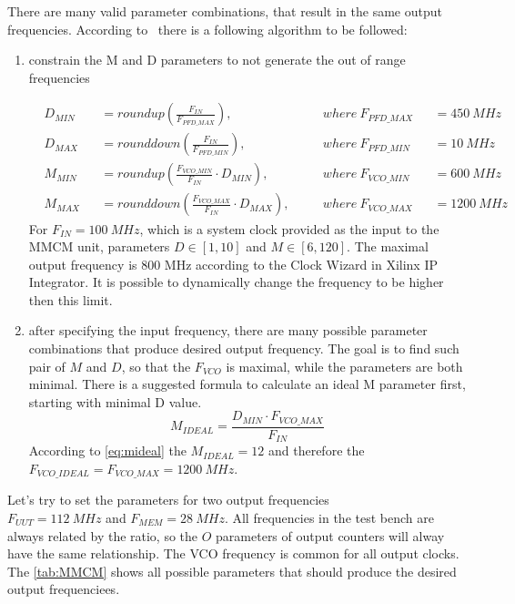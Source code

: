There are many valid parameter combinations, that result in the same output frequencies. According to~\cite{manual:MMCM} there is a following algorithm to be followed:
\begin{enumerate}
    \item constrain the M and D parameters to not generate the out of range frequencies 

    \begin{subequations}
        \begin{alignat}{4}
            & D_{MIN} &&=roundup(\frac{F_{IN}}{F_{PFD\_MAX}}),\quad && where \ F_{PFD\_MAX} && =450 \ MHz \label{eq:dmin}\\
            & D_{MAX} &&=rounddown(\frac{F_{IN}}{F_{PFD\_MIN}}),\quad  && where \ F_{PFD\_MIN} && =10 \ MHz \label{eq:dmax}\\
            & M_{MIN} &&=roundup(\frac{F_{VCO\_MIN}}{F_{IN}} \cdot D_{MIN}),\quad && where \ F_{VCO\_MIN} && =600 \ MHz \label{eq:mmin}\\
            & M_{MAX} &&=rounddown(\frac{F_{VCO\_MAX}}{F_{IN}} \cdot D_{MAX}),\quad && where \ F_{VCO\_MAX} && =1200 \ MHz \label{eq:mmax}
        \end{alignat}
    \end{subequations}
For $F_{IN} = 100 \ MHz$, which is a system clock provided as the input to the MMCM unit, parameters $D \in [1,10]$ and $M \in [6,120]$. The maximal output frequency is 800 MHz according to the Clock Wizard in Xilinx IP Integrator. It is possible to dynamically change the frequency to be higher then this limit.
    \item after specifying the input frequency, there are many possible parameter combinations that produce desired output frequency. The goal is to find such pair of $M$ and $D$, so that the $F_{VCO}$ is maximal, while the parameters are both minimal. There is a suggested formula to calculate an ideal M parameter first, starting with minimal D value.
    \begin{equation}
        M_{IDEAL} = \frac{D_{MIN} \cdot F_{VCO\_MAX}}{F_{IN}} \label{eq:mideal}
    \end{equation}
    According to \autoref{eq:mideal} the $ M_{IDEAL} = 12$ and therefore the $F_{VCO\_IDEAL}=F_{VCO\_MAX}=1200 \ MHz$. 
\end{enumerate}
Let's try to set the parameters for two output frequencies \\$F_{UUT} = 112 \ MHz$ and $F_{MEM} = 28 \ MHz$. All frequencies in the test bench are always related by the ratio, so the $O$ parameters of output counters will alway have the same relationship. The VCO frequency is common for all output clocks.
The \autoref{tab:MMCM} shows all possible parameters that should produce the desired output frequenciees.

